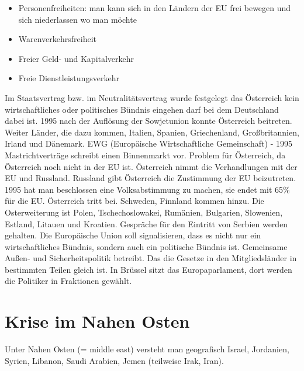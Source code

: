\documentclass[a4paper,final]{report}
\begin{document}
\begin{itemize}
\item Personenfreiheiten: man kann sich in den Ländern der EU frei bewegen und sich niederlassen wo man möchte
\item Warenverkehrsfreiheit
\item Freier Geld- und Kapitalverkehr
\item Freie Dienstleistungsverkehr
\end{itemize}

Im Staatsvertrag bzw. im Neutralitätsvertrag wurde festgelegt das Österreich kein wirtschaftliches oder politisches Bündnis  eingehen darf bei dem Deutschland dabei ist. 1995 nach der Auflösung der Sowjetunion konnte Österreich beitreten. Weiter Länder, die dazu kommen, Italien, Spanien, Griechenland, Großbritannien, Irland und Dänemark.
\newline
\newline
EWG (Europäische Wirtschaftliche Gemeinschaft) - 1995 Mastrichtverträge schreibt einen Binnenmarkt vor. Problem für Österreich, da Österreich noch nicht in der EU ist. Österreich nimmt die Verhandlungen  mit der EU und Russland. Russland gibt Österreich die Zustimmung der EU beizutreten. 1995 hat man beschlossen eine Volksabstimmung zu machen, sie endet mit 65\% für die EU. Österreich tritt bei.
\newline
\newline
Schweden, Finnland kommen hinzu. Die Osterweiterung ist Polen, Tschechoslowakei, Rumänien, Bulgarien, Slowenien, Estland, Litauen und Kroatien. Gespräche für den Eintritt von Serbien werden gehalten. 
\newline
\newline
Die Europäische Union soll signalisieren, dass es nicht nur ein wirtschaftliches Bündnis, sondern auch ein politische Bündnis ist. Gemeinsame Außen- und Sicherheitspolitik betreibt. Das die Gesetze in den Mitgliedsländer in bestimmten Teilen gleich ist.
\newline
\newline
In Brüssel sitzt das Europaparlament, dort werden die Politiker in Fraktionen gewählt.

\section{Krise im Nahen Osten}

Unter Nahen Osten (= middle east) versteht man geografisch Israel, Jordanien, Syrien, Libanon, Saudi Arabien, Jemen (teilweise Irak, Iran).
\end{document}
